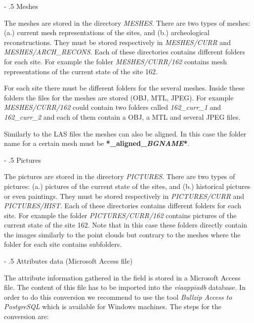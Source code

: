 \documentclass[a4paper,11pt]{article}
\makeatletter
\renewcommand\paragraph{%
   \@startsection{paragraph}{4}{0mm}%
      {-\baselineskip}%
      {.5\baselineskip}%
      {\normalfont\normalsize\bfseries}}
\makeatother
\begin{document}
\paragraph{Meshes}

The meshes are stored in the directory \textit{MESHES}. There are two types of meshes: (a.) current  mesh representations of the sites, and (b.) archeological reconstructions. They must be stored respectively in \textit{MESHES/CURR} and \textit{MESHES/ARCH\_RECONS}. Each of these directories contains different folders for each site. For example the folder \textit{MESHES/CURR/162} contains mesh representations of the current state of the site 162. 

For each site there must be different folders for the several meshes. Inside these folders the files for the meshes are stored (OBJ, MTL, JPEG). For example \textit{MESHES/CURR/162} could contain two folders called \textit{162\_curr\_1} and \textit{162\_curr\_2} and each of them contain a OBJ, a MTL and several JPEG files. 

Similarly to the LAS files the meshes can also be aligned. In this case the folder name for a certain mesh must be \textbf{*\_aligned\_\textit{BGNAME}*}. 

\paragraph{Pictures}

The pictures are stored in the directory \textit{PICTURES}. There are two types of pictures: (a.) pictures of the current state of the sites, and (b.) historical pictures or even paintings. They must be stored respectively in \textit{PICTURES/CURR} and \textit{PICTURES/HIST}. Each of these directories contains different folders for each site. For example the folder \textit{PICTURES/CURR/162} contains pictures of the current state of the site 162. Note that in this case these folders directly contain the images similarly to the point clouds but contrary to the meshes where the folder for each site contains subfolders.

\paragraph{Attributes data (Microsoft Access file)}

The attribute information gathered in the field is stored in a Microsoft Access file. The content of this file has to be imported into the \textit{viaappiadb} database. In order to do this conversion we recommend to use the tool \textit{Bullzip Access to PostgreSQL} which is available for Windows machines. The steps for the conversion are:
\end{document}

